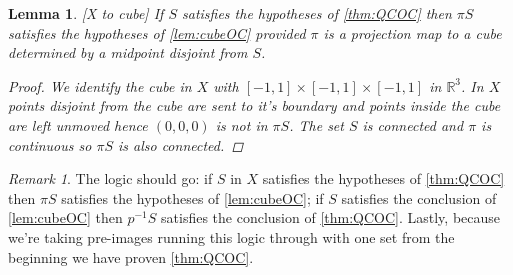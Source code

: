 \documentclass{article}
\theoremstyle{mystyle}
\newtheorem{lem}{Lemma}[section]
\theoremstyle{remark}
\newtheorem{rmk}{Remark}[section]
\begin{document}
\begin{lem}
	\label{lem:Xtocube}
	[X to cube]
	If \(S\) satisfies the hypotheses of \ref{thm:QCOC} then \(\pi S\) satisfies the hypotheses of \ref{lem:cubeOC} provided \(\pi\) is a projection map to a cube determined by a midpoint disjoint from \(S\).
\begin{proof}
	We identify the cube in \(X\) with \([-1,1] \times [-1,1] \times [-1,1]\)  in \(\mathbb{R}^{3}\). In \(X\) points disjoint from the cube are sent to it's boundary and points inside the cube are left unmoved hence \((0,0,0)\) is not in \(\pi S\). The set \(S\) is connected and \(\pi\) is continuous so \(\pi S\) is also connected.  
			
\end{proof}
	


\end{lem}

\begin{rmk}
The logic should go: if \(S\) in \(X\) satisfies the hypotheses of \ref{thm:QCOC} then \(\pi S\) satisfies the hypotheses of \ref{lem:cubeOC}; if \(S\) satisfies the conclusion of \ref{lem:cubeOC} then \(p^{-1} S\) satisfies the conclusion of \ref{thm:QCOC}. Lastly, because we're taking pre-images running this logic through with one set from the beginning we have proven \ref{thm:QCOC}.
\end{rmk}
\end{document}
